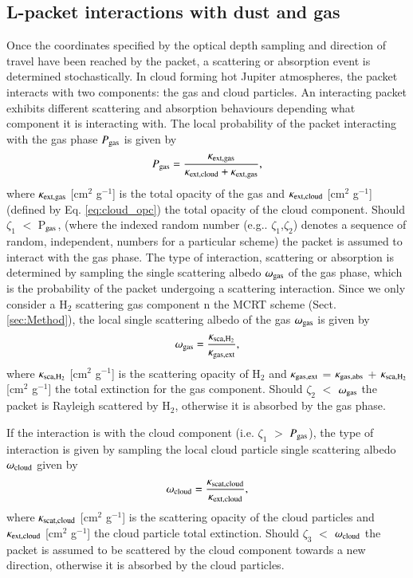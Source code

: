 \documentclass{aa}
\begin{document}
\subsection{L-packet interactions with dust and gas}

Once the coordinates specified by the optical depth sampling and direction of travel have been reached by the packet, a scattering or absorption event is determined stochastically.
In cloud forming hot Jupiter atmospheres, the packet interacts with two components: the gas and cloud particles.
An interacting packet exhibits different scattering and absorption behaviours depending what component it is interacting with.
The local probability of the packet interacting with the gas phase $P_{\rm gas}$ is given by
\begin{equation}
P_{\rm gas} = \frac{\kappa_{\rm ext, gas}}{\kappa_{\rm ext, cloud} + \kappa_{\rm ext, gas}},
\end{equation}
where $\kappa_{\rm ext, gas}$ [cm$^{2}$ g$^{-1}$] is the total opacity of the gas and $\kappa_{\rm ext, cloud}$  [cm$^{2}$ g$^{-1}$] (defined by Eq. \ref{eq:cloud_opc}) the total opacity of the cloud component.
Should $\zeta_{1}$  $<$ P$_{\rm gas}$, (where the indexed random number (e.g.. $\zeta_{1}$,$\zeta_{2}$) denotes a sequence of random, independent, numbers for a particular scheme) the packet is assumed to interact with the gas phase.
The type of interaction, scattering or absorption is determined by sampling the single scattering albedo $\omega_{\rm gas}$ of the gas phase, which is the probability of the packet undergoing a scattering interaction.
Since we only consider a H$_{2}$ scattering gas component n the MCRT scheme (Sect. \ref{sec:Method}), the local single scattering albedo of the gas $\omega_{\rm gas}$ is given by
\begin{equation}
\label{eq:gas_alb}
\omega_{\rm gas} = \frac{\kappa_{\rm sca, H_{2}}}{\kappa_{\rm gas,ext}} ,
\end{equation}
where $\kappa_{\rm sca, H_{2}}$ [cm$^{2}$ g$^{-1}$] is the scattering opacity of H$_{2}$ and $\kappa_{\rm gas,ext}$ = $\kappa_{\rm gas,abs}$ + $\kappa_{\rm sca, H_{2}}$ [cm$^{2}$ g$^{-1}$] the total extinction for the gas component. 
Should  $\zeta_{2}$  $<$ $\omega_{\rm gas}$ the packet is Rayleigh scattered by H$_{2}$, otherwise it is absorbed by the gas phase.

If the interaction is with the cloud component (i.e.  $\zeta_{1}$ $>$ $P_{\rm gas}$), the type of interaction is given by sampling the local cloud particle single scattering albedo $\omega_{\rm cloud}$ given by
\begin{equation}
\label{eq:cloud_alb}
\omega_{\rm cloud} = \frac{\kappa_{\rm scat, cloud}}{\kappa_{\rm ext, cloud}},
\end{equation}
where $\kappa_{\rm scat, cloud}$ [cm$^{2}$ g$^{-1}$] is the scattering opacity of the cloud particles and $\kappa_{\rm ext, cloud}$  [cm$^{2}$ g$^{-1}$] the cloud particle total extinction.
Should $\zeta_{3}$ $<$ $\omega_{\rm cloud}$ the packet is assumed to be scattered by the cloud component towards a new direction, otherwise it is absorbed by the cloud particles.
\end{document}
